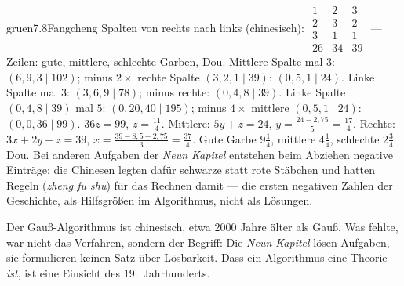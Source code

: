 \begin{loesungkarte}{gruen}{7.8}{Fangcheng}
Spalten von rechts nach links (chinesisch): $\begin{array}{ccc}1 & 2 & 3\\ 2 & 3 & 2\\ 3 & 1 & 1\\ 26 & 34 & 39\end{array}$ --- Zeilen: gute, mittlere, schlechte Garben, Dou.
Mittlere Spalte mal $3$: $(6, 9, 3\mid102)$; minus $2\times$ rechte Spalte $(3, 2, 1\mid39)$: $(0, 5, 1\mid24)$. Linke Spalte mal $3$: $(3, 6, 9\mid78)$; minus rechte: $(0, 4, 8\mid39)$.
Linke Spalte $(0, 4, 8\mid39)$ mal $5$: $(0, 20, 40\mid195)$; minus $4\times$ mittlere $(0, 5, 1\mid24)$: $(0, 0, 36\mid99)$.
$36z = 99$, $z = \frac{11}4$. Mittlere: $5y + z = 24$, $y = \frac{24 - 2{,}75}5 = \frac{17}4$. Rechte: $3x + 2y + z = 39$, $x = \frac{39 - 8{,}5 - 2{,}75}3 = \frac{37}4$. Gute Garbe $9\frac14$, mittlere $4\frac14$, schlechte $2\frac34$ Dou.
Bei anderen Aufgaben der \emph{Neun Kapitel} entstehen beim Abziehen negative Einträge; die Chinesen legten dafür schwarze statt rote Stäbchen und hatten Regeln (\emph{zheng fu shu}) für das Rechnen damit --- die ersten negativen Zahlen der Geschichte, als Hilfsgrößen im Algorithmus, nicht als Lösungen.
\begin{mitnehmen}\kastentext
Der Gauß-Algorithmus ist chinesisch, etwa $2000$ Jahre älter als Gauß. Was fehlte, war nicht das Verfahren, sondern der Begriff: Die \emph{Neun Kapitel} lösen Aufgaben, sie formulieren keinen Satz über Lösbarkeit. Dass ein Algorithmus eine Theorie \emph{ist}, ist eine Einsicht des 19.\ Jahrhunderts.
\end{mitnehmen}
\end{loesungkarte}

